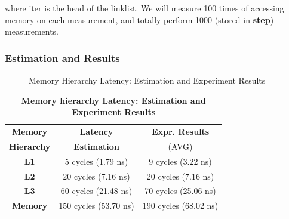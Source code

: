 where iter is the head of the linklist. We will measure 100 times of accessing memory on each measurement, and totally perform 1000 (stored in \textbf{step}) measurements.

\subsubsection{Estimation and Results}

\begin{figure}[ht]
    \centering
    \caption{Memory Hierarchy Latency: Estimation and Experiment Results }
    \label{mem_latency_result}
\end{figure}

\begin{table}[ht]
  \centering
  \caption{\textbf{Memory hierarchy Latency: Estimation and Experiment Results}}
  \begin{threeparttable}
  \begin{tabular}{ccc}
  \hline
      \textbf{Memory}    & \textbf{Latency}   & \textbf{Expr. Results} \\
      \textbf{Hierarchy}   & \textbf{Estimation}  & (AVG)   \\
  \hline
      \textbf{L1}  & 5 cycles (1.79 ns) & 9 cycles (3.22 ns)   \\
      \textbf{L2}  & 20 cycles (7.16 ns) & 20 cycles (7.16 ns)  \\
      \textbf{L3}  & 60 cycles (21.48 ns) & 70 cycles (25.06 ns)  \\
      \textbf{Memory}  & 150 cycles (53.70 ns)  & 190 cycles (68.02 ns)  \\
  \hline
  \end{tabular}
  \end{threeparttable}
  \label{memory_latency_table}
\end{table}

